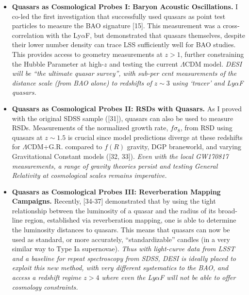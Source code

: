 \documentclass[oneside, a4paper, onecolumn, 11pt]{article}
\begin{document}
\begin{itemize}
\item{{\bf Quasars as Cosmological Probes {\sc I:} Baryon Acoustic
      Oscillations.} I co-led the first investigation that successfully used
    quasars as point test particles to measure the BAO signature
    [15]. This measurement was a cross-correlation with the Ly$\alpha$F,
    but demonstrated that quasars themselves, despite their lower number
    density can trace LSS sufficiently well for BAO studies. This
    provides access to geometry measurements at $z>1$, further
    constraining the Hubble Parameter at high-$z$ and testing the current
    $\Lambda$CDM model.  {\it DESI will be ``the ultimate quasar survey'',
      with sub-per cent measurements of the distance scale (from BAO alone)
      to redshifts of $z\sim3$ using `tracer' and Ly$\alpha$F quasars.}}
  
\item{{\bf Quasars as Cosmological Probes {\sc II:} RSDs with
      Quasars.}  As I proved with the original SDSS sample ([31]), quasars
    can also be used to measure RSDs.  Measurements of the normalized
    growth rate, $f\sigma_{8}$, from RSD using quasars at $z\sim1.5$ is
    crucial since model predictions diverge at these redshifts for
    $\Lambda$CDM+G.R. compared to $f(R)$ gravity, DGP braneworld, and varying
    Gravitational Constant models ([32, 33]). {\it Even with the local
      GW170817 measurements, a range of gravity theories persist and
      testing General Relativity at cosmological scales remains imperative.}}
  
\item{{\bf Quasars as Cosmological Probes {\sc III:} Reverberation
      Mapping Campaigns.}  Recently, [34-37] demonstrated that by using the
    tight relationship between the luminosity of a quasar and the radius
    of its broad-line region, established via reverberation mapping, one
    is able to determine the luminosity distances to quasars.  This means
    that quasars can now be used as standard, or more accurately,
    ``standardizable'' candles (in a very similar way to Type Ia
    supernovae). {\it Thus with light-curve data from LSST and a baseline
      for repeat spectroscopy from SDSS, DESI is ideally placed to exploit
      this new method, with very different systematics to the BAO, and
      access a redshift regime $z>4$ where even the Ly$\alpha$F will not be
      able to offer cosmology constraints.}}

\end{itemize}
\end{document}
